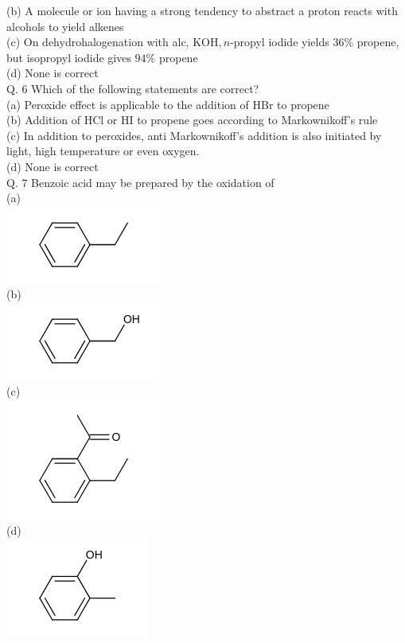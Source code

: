 \documentclass[10pt]{article}
\begin{document}
(b) A molecule or ion having a strong tendency to abstract a proton reacts with alcohols to yield alkenes\\
(c) On dehydrohalogenation with alc, $\mathrm{KOH}, n$-propyl iodide yields $36 \%$ propene, but isopropyl iodide gives $94 \%$ propene\\
(d) None is correct\\
Q. 6 Which of the following statements are correct?\\
(a) Peroxide effect is applicable to the addition of HBr to propene\\
(b) Addition of HCl or HI to propene goes according to Markownikoff's rule\\
(c) In addition to peroxides, anti Markownikoff's addition is also initiated by light, high temperature or even oxygen.\\
(d) None is correct\\
Q. 7 Benzoic acid may be prepared by the oxidation of\\
(a)\\
\includegraphics{smile-4ce930a40c09c66f19bd519d0bd316249818b1bc}\\
(b)\\
\includegraphics{smile-dd6c9321f3a921847d9c3914408df2e5abfd905c}\\
(c)\\
\includegraphics{smile-625401b20e005471cc5f8e5c3019e1c6784218fc}\\
(d)\\
\includegraphics{smile-37235414fc82c6835a23b4b2f78ab3072024cb8a}\\
\end{document}

